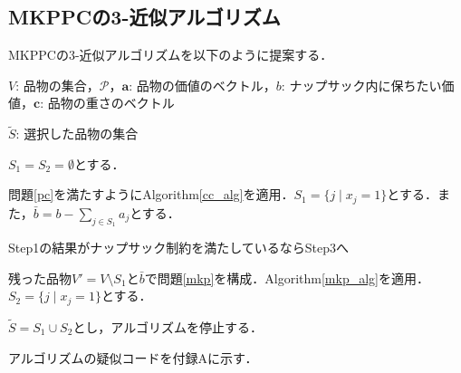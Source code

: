 \documentclass[11pt,dvipdfmx]{jarticle}
\numberwithin{equation}{section}
\begin{document}
    \subsection{MKPPCの3-近似アルゴリズム}
        MKPPCの3-近似アルゴリズムを以下のように提案する．\par
        \begin{description}
            \setlength{\leftskip}{0.5cm}
            \setlength{\rightskip}{1.0cm}
            \item[Algorithm\ref{mkpcc_alg}]
            \item[Input:] $V$: 品物の集合，$\mathcal{P}$，$\bm{a}$: 品物の価値のベクトル，$b$: ナップサック内に保ちたい価値，$\bm{c}$: 品物の重さのベクトル
            \item[Output:] $\tilde{S}$: 選択した品物の集合
            \item[Step0:] $S_1=S_2=\emptyset$とする．
            \item[Step1:] 問題\eqref{pc}を満たすようにAlgorithm\ref{cc_alg}を適用．$S_1=\{j\mid x_j=1\}$とする．また，$\bar{b}=b-\sum_{j\in S_1}{a_j}$とする．
            \item[※] Step1の結果がナップサック制約を満たしているならStep3へ
            \item[Step2:] 残った品物$V'=V\setminus S_1$と$\bar{b}$で問題\eqref{mkp}を構成．Algorithm\ref{mkp_alg}を適用．$S_2=\{j\mid x_j=1\}$とする．
            \item[Step3:] $\tilde{S}=S_1\cup S_2$とし，アルゴリズムを停止する．
        \end{description}
        アルゴリズムの疑似コードを付録Aに示す．
\end{document}
